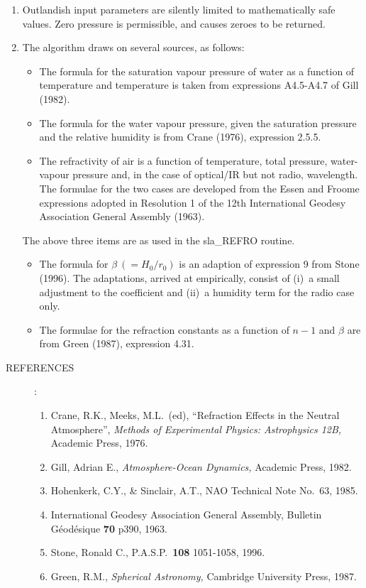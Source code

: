 \documentclass[11pt,twoside]{article}
\newcommand{\arcsec}[2] {\arcseci{#1}$\hspace{-0.4em}.#2$}
\newcommand{\arcsec}[2] {
      {$#1\hspace{-0.05em}^{'\hspace{-0.1em}'}\hspace{-0.4em}.#2$}
   }
\newcommand{\arcseci}[1] {$#1\hspace{-0.05em}$\raisebox{-0.5ex}
                         {$^{'\hspace{-0.1em}'}$}}
\renewcommand{\arcseci}[1] {$#1\hspace{-0.05em}^{'\hspace{-0.1em}'}$}
\newlength{\oldspacing}
\newcommand{\refs}[1]
{
  \goodbreak
  \setlength{\oldspacing}{\topsep}
  \setlength{\topsep}{0.3ex}
  \begin{description}
    \item[REFERENCES]:
        #1
  \end{description}
  \setlength{\topsep}{\oldspacing}
}
\newcommand{\refs}[1]
   {
     \begin{description}
       \item[REFERENCES:]
           #1
     \end{description}
   }
\begin{document}
{\begin{enumerate}
        The results from the much slower but more accurate sla\_REFCO
        routine have not been included in the tabulation as they are
        identical to those in the sla\_REFRO column to the \arcsec{0}{01}
        resolution used.
  \item Outlandish input parameters are silently limited
        to mathematically safe values.  Zero pressure is permissible,
        and causes zeroes to be returned.
  \item The algorithm draws on several sources, as follows:
        \begin{itemize}
        \item The formula for the saturation vapour pressure of water as
              a function of temperature and temperature is taken from
              expressions A4.5-A4.7 of Gill (1982).
        \item The formula for the water vapour pressure, given the
              saturation pressure and the relative humidity is from
              Crane (1976), expression 2.5.5.
        \item The refractivity of air is a function of temperature,
              total pressure, water-vapour pressure and, in the case
              of optical/IR but not radio, wavelength.  The formulae
              for the two cases are developed from the Essen and Froome
              expressions adopted in Resolution 1 of the 12th International
              Geodesy Association General Assembly (1963).
        \end{itemize}
        The above three items are as used in the sla\_REFRO routine.
        \begin{itemize}
        \item The formula for $\beta~(=H_0/r_0)$ is
              an adaption of expression 9 from Stone (1996).  The
              adaptations, arrived at empirically, consist of (i)~a
              small adjustment to the coefficient and (ii)~a humidity
              term for the radio case only.
        \item The formulae for the refraction constants as a function of
              $n-1$ and $\beta$ are from Green (1987), expression 4.31.
        \end{itemize}
  \end{enumerate}
}
\refs
{
 \begin{enumerate}
  \item Crane, R.K., Meeks, M.L.\ (ed), ``Refraction Effects in
        the Neutral Atmosphere'',
        {\it Methods of Experimental Physics: Astrophysics 12B,}\/
        Academic Press, 1976.
  \item Gill, Adrian E., {\it Atmosphere-Ocean Dynamics,}\/
        Academic Press, 1982.
  \item Hohenkerk, C.Y., \& Sinclair, A.T., NAO Technical Note
        No.~63, 1985.
  \item International Geodesy Association General Assembly, Bulletin
        G\'{e}od\'{e}sique {\bf 70} p390, 1963.
  \item Stone, Ronald C., P.A.S.P.~{\bf 108} 1051-1058, 1996.
  \item Green, R.M., {\it Spherical Astronomy,}\/ Cambridge
        University Press, 1987.
 \end{enumerate}
}
\end{document}
